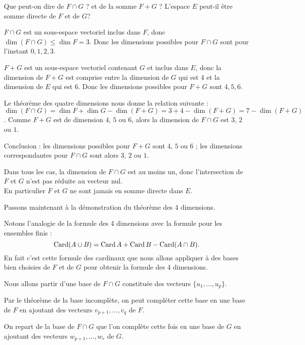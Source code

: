 \change
Que peut-on dire de $F\cap G$ ? et de la somme $F+G$ ? L'espace $E$ peut-il être somme directe de $F$ et de $G$?

\change 
$F \cap G$ est un sous-espace vectoriel inclus dans $F$, donc 
  $\dim (F \cap G) \le \dim F=3$. Donc les dimensions possibles pour $F \cap G$ sont
  pour l'instant $0,1,2,3$.
  
  \change $F+G$ est un sous-espace vectoriel contenant $G$ et inclus dans $E$, donc la dimension de $F+G$ est comprise entre la dimension de $G$ qui est 4 et la dimension de $E$ qui est 6. Donc les dimensions possibles 
  pour $F + G$ sont $4,5,6$.
  
\change Le théorème  des quatre dimensions nous donne la relation suivante :
  $\dim(F\cap G) =  \dim F + \dim G - \dim(F+G) = 3+4-\dim(F+G) =  7-\dim(F+G)$. 
  Comme $F + G$ est de dimension $4$, $5$ ou $6$, alors la dimension de $F\cap G$ est 
  $3$, $2$ ou $1$. 
  
  \change Conclusion : les dimensions possibles pour $F+G$ sont $4$, $5$ ou $6$ ;
  les dimensions correspondantes pour $F \cap G$ sont alors $3$, $2$ ou $1$.
  
  \change
  Dans tous les cas, la dimension de $F\cap G$ est au moins un, donc l'intersection de $F$ et $G$ n'est pas réduite au vecteur nul.\\
  
  En particulier $F$ et $G$ ne sont jamais en somme directe
  dans $E$.




\diapo
Passons maintenant à la démonstration du théorème des 4 dimensions.


\change
Notons l'analogie de la formule des 4 dimensions avec la formule pour les ensembles finis :
$$\mathop{\text{Card}}\nolimits (A\cup B) = \mathop{\text{Card}}\nolimits A + \mathop{\text{Card}}\nolimits B - \mathop{\text{Card}}\nolimits (A\cap B).$$ En fait c'est cette formule des cardinaux que nous allons appliquer à des bases bien choisies de $F$ et de $G$ pour obtenir la formule des 4 dimensions.

\change
Nous allons partir d'une base  de $F \cap G$ constituée des vecteurs $\{u_1,\ldots,u_p\}$.

\change
Par le théorème de la base incomplète, on peut compléter cette base  en une base de $F$ en ajoutant des vecteurs $v_{p+1}, \ldots, v_q$ de $F$.

\change
On repart de la base de $F\cap G$ que l'on complète cette fois 
en une base de $G$ en ajoutant des vecteurs $w_{p+1},\ldots,w_r$ de $G$.

